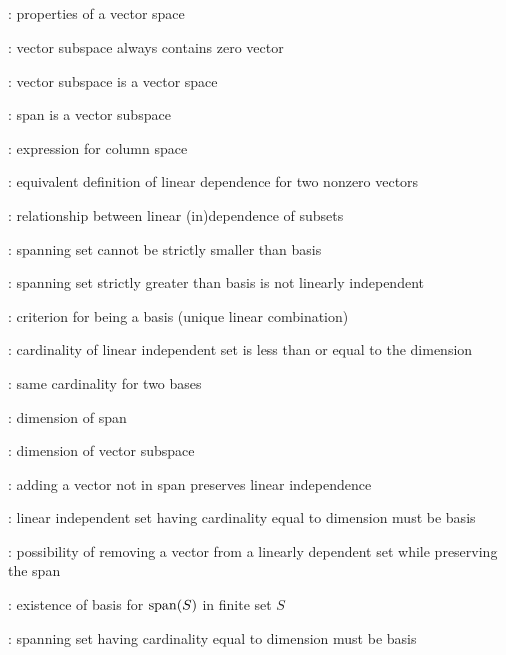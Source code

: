 \subsection*{}
\item {}: properties of a vector space
\item {}: vector subspace always contains zero vector
\item {}: vector subspace is a vector space
\item {}: span is a vector subspace
\item {}: expression for column space
\item {}: equivalent definition of linear dependence for two nonzero vectors
\item {}: relationship between linear (in)dependence of subsets
\item {}: spanning set cannot be strictly smaller than basis
\item {}: spanning set strictly greater than basis is not linearly independent
\item {}: criterion for being a basis (unique linear combination)
\item {}: cardinality of linear independent set is less than or equal to the dimension
\item {}: same cardinality for two bases
\item {}: dimension of span
\item {}: dimension of vector subspace
\item {}: adding a vector not in span preserves linear independence
\item {}: linear independent set having cardinality equal to dimension must be basis
\item {}: possibility of removing a vector from a linearly dependent set while preserving the span
\item {}: existence of basis for \(\operatorname{span}(S)\) in finite set \(S\)
\item {}: spanning set having cardinality equal to dimension must be basis
